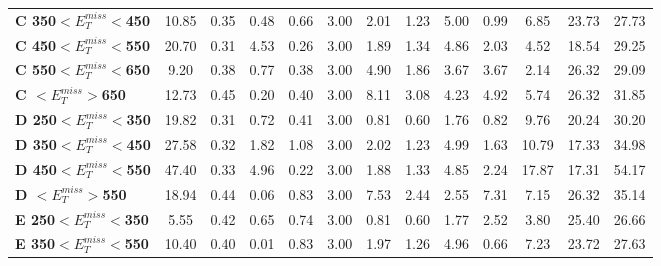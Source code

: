 \begin{table}[h]
\begin{center}
{\begin{tabular}{|l|cccccccccccc|}
\textbf{ C 350$<E_T^{miss}<$450}         & 10.85         & 0.35          & 0.48          & 0.66          & 3.00          & 2.01          & 1.23          & 5.00          & 0.99          & 6.85          & 23.73         & 27.73         \\
\textbf{ C 450$<E_T^{miss}<$550}         & 20.70         & 0.31          & 4.53          & 0.26          & 3.00          & 1.89          & 1.34          & 4.86          & 2.03          & 4.52          & 18.54         & 29.25         \\
\textbf{ C 550$<E_T^{miss}<$650}         & 9.20          & 0.38          & 0.77          & 0.38          & 3.00          & 4.90          & 1.86          & 3.67          & 3.67          & 2.14          & 26.32         & 29.09         \\
\textbf{ C $<E_T^{miss}>$650}    & 12.73         & 0.45          & 0.20          & 0.40          & 3.00          & 8.11          & 3.08          & 4.23          & 4.92          & 5.74          & 26.32         & 31.85         \\
\textbf{ D 250$<E_T^{miss}<$350}         & 19.82         & 0.31          & 0.72          & 0.41          & 3.00          & 0.81          & 0.60          & 1.76          & 0.82          & 9.76          & 20.24         & 30.20         \\
\textbf{ D 350$<E_T^{miss}<$450}         & 27.58         & 0.32          & 1.82          & 1.08          & 3.00          & 2.02          & 1.23          & 4.99          & 1.63          & 10.79         & 17.33         & 34.98         \\
\textbf{ D 450$<E_T^{miss}<$550}         & 47.40         & 0.33          & 4.96          & 0.22          & 3.00          & 1.88          & 1.33          & 4.85          & 2.24          & 17.87         & 17.31         & 54.17         \\
\textbf{ D $<E_T^{miss}>$550}    & 18.94         & 0.44          & 0.06          & 0.83          & 3.00          & 7.53          & 2.44          & 2.55          & 7.31          & 7.15          & 26.32         & 35.14         \\
\textbf{ E 250$<E_T^{miss}<$350}         & 5.55          & 0.42          & 0.65          & 0.74          & 3.00          & 0.81          & 0.60          & 1.77          & 2.52          & 3.80          & 25.40         & 26.66         \\
\textbf{ E 350$<E_T^{miss}<$550}         & 10.40         & 0.40          & 0.01          & 0.83          & 3.00          & 1.97          & 1.26          & 4.96          & 0.66          & 7.23          & 23.72         & 27.63         \\

\end{tabular}}
\end{center}
\end{table}
